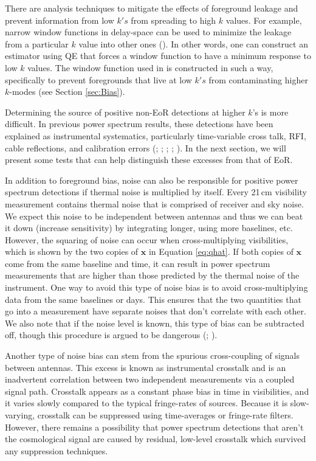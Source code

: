 \documentclass[preprint2,numberedappendix,tighten]{aastex6}  %
\begin{document}
There are analysis techniques to mitigate the effects of foreground leakage and prevent information from low $k's$ from 
spreading to high $k$ values. For example, narrow window functions in delay-space can be used to minimize the leakage from a particular 
$k$ value into other ones (\citealt{liu_et_al2014b}). In other words, one can construct an estimator using QE that forces a 
window function to have a minimum response to low $k$ values. The window function used in  is constructed in such a way, 
specifically to prevent foregrounds that live at low $k's$ from contaminating higher $k$-modes (see Section \ref{sec:Bias}). 

Determining the source of positive non-EoR detections at higher $k$'s is more difficult. In previous power spectrum results, these detections have been explained as instrumental systematics, particularly time-variable cross talk, RFI, cable reflections, and calibration errors (; \citealt{parsons_et_al2014}; \citealt{dillon_et_al2014}; \citealt{beardsley_et_al2016}; \citealt{patil_et_al2017}). In the next section, we will present some tests that can help distinguish these excesses from that of EoR. 

In addition to foreground bias, noise can also be responsible for positive power spectrum detections if thermal noise is 
multiplied by itself. Every 21\,cm visibility measurement contains thermal noise that is comprised of receiver and sky noise. 
We expect this noise to be independent between antennas and thus we can beat it down (increase sensitivity) by integrating 
longer, using more baselines, etc. However, the squaring of noise can occur when cross-multiplying visibilities, which is shown by 
the two copies of $\textbf{x}$ in Equation \eqref{eq:qhat}. If both copies of $\textbf{x}$ come from the same baseline and time, it 
can result in power spectrum measurements that are higher than those predicted by the thermal noise of the instrument. One 
way to avoid this type of noise bias is to avoid cross-multiplying data from the same baselines or days. This ensures that the 
two quantities that go into a measurement have separate noises that don't correlate with each other. We also note that if the noise level is known, this type of bias can be subtracted off, though this procedure is argued to be dangerous (\citealt{dillon_et_al2014}; \citealt{parsons_et_al2014}).

Another type of noise bias can stem from the spurious cross-coupling of signals between antennas. This excess is known as 
instrumental crosstalk and is an inadvertent correlation between two independent measurements via a coupled signal path. 
Crosstalk appears as a constant phase bias in time in visibilities, and it varies slowly compared to the typical fringe-rates of 
sources. Because it is slow-varying, crosstalk can be suppressed using time-averages or fringe-rate filters. However, there 
remains a possibility that power spectrum detections that aren't the cosmological signal are caused by residual, low-level crosstalk which survived any 
suppression techniques. 
\end{document}
